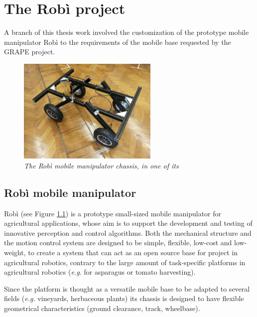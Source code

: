 
\chapter{The Robì project} \label{chap:robìProject}

A branch of this thesis work involved the customization of the prototype mobile manipulator Robì \parencite{robi} to the requirements of the mobile base requested by the \ac{GRAPE} project. 


\begin{figure}
	\centering
	\includegraphics[width=0.6\textwidth]{Images/robi/robi_inizio.png}
	\caption{\textit{The Robì mobile manipulator chassis, in one of its}}
	\label{fig:robiDefault}
\end{figure}


\section{Robì mobile manipulator}\label{sec:robiDescr}
Robì (see Figure \ref{fig:robiDefault}) is a prototype small-sized mobile manipulator for agricultural applications, whose aim is to support the development and testing of innovative perception and control algorithms. Both the mechanical structure and the motion control system are designed to be simple, flexible, low-cost and low-weight, to create a system that can act as an open source base for project in agricultural robotics, contrary to the large amount of task-specific platforms in agricultural robotics (\textit{e.g.} for asparagus \parencite{asparagi} or tomato \parencite{pomodori} harvesting).

\par Since the platform is thought as a versatile mobile base to be adapted to several fields (\textit{e.g.} vineyards, herbaceous plants) its chassis is designed to have flexible geometrical characteristics (ground clearance, track, wheelbase).

